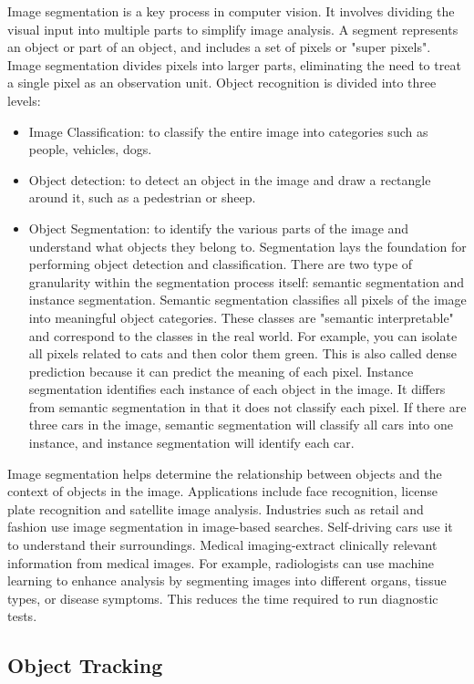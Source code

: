 Image segmentation is a key process in computer vision. It involves dividing the visual input into multiple parts to simplify image analysis. A segment represents an object or part of an object, and includes a set of pixels or "super pixels". Image segmentation divides pixels into larger parts, eliminating the need to treat a single pixel as an observation unit. Object recognition is divided into three levels:
\begin{itemize}
	\item Image Classification: to classify the entire image into categories such as people, vehicles, dogs.
	\item Object detection: to detect an object in the image and draw a rectangle around it, such as a pedestrian or sheep.
	\item Object Segmentation: to identify the various parts of the image and understand what objects they belong to. Segmentation lays the foundation for performing object detection and classification. There are two type of granularity within the segmentation process itself: semantic segmentation and instance segmentation. Semantic segmentation classifies all pixels of the image into meaningful object categories. These classes are "semantic interpretable" and correspond to the classes in the real world. For example, you can isolate all pixels related to cats and then color them green. This is also called dense prediction because it can predict the meaning of each pixel. Instance segmentation identifies each instance of each object in the image. It differs from semantic segmentation in that it does not classify each pixel. If there are three cars in the image, semantic segmentation will classify all cars into one instance, and instance segmentation will identify each car.
\end{itemize}
Image segmentation helps determine the relationship between objects and the context of objects in the image. Applications include face recognition, license plate recognition and satellite image analysis. Industries such as retail and fashion use image segmentation in image-based searches. Self-driving cars use it to understand their surroundings. Medical imaging-extract clinically relevant information from medical images. For example, radiologists can use machine learning to enhance analysis by segmenting images into different organs, tissue types, or disease symptoms. This reduces the time required to run diagnostic tests.
\subsection{Object Tracking}

